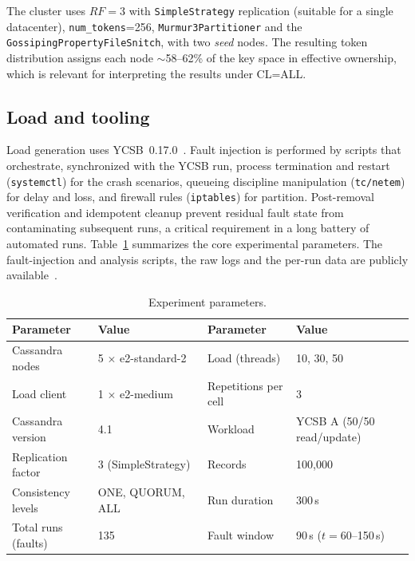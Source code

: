 \documentclass[runningheads]{llncs}
\begin{document}
The cluster uses $RF=3$ with \texttt{SimpleStrategy} replication (suitable for a
single datacenter), \texttt{num\_tokens}=256, \texttt{Murmur3\-Partitioner} and
the \texttt{Gossiping\-Property\-File\-Snitch}, with two \emph{seed} nodes. The
resulting
token distribution assigns each node $\sim$58--62\% of the key space in effective
ownership, which is relevant for interpreting the results under CL=ALL.

\subsection{Load and tooling}

Load generation uses YCSB~0.17.0~\cite{ycsb}. Fault injection is performed by
scripts that orchestrate, synchronized with the YCSB run, process termination and
restart (\texttt{systemctl}) for the crash scenarios, queueing discipline
manipulation (\texttt{tc/netem}) for delay and loss, and firewall rules
(\texttt{iptables}) for partition. Post-removal verification and idempotent
cleanup prevent residual fault state from contaminating subsequent runs, a
critical requirement in a long battery of automated runs. Table~\ref{tab:params}
summarizes the core experimental parameters. The fault-injection and analysis
scripts, the raw logs and the per-run data are publicly available~\cite{artifact}.

\begin{table}[t]
\centering
\scriptsize
\renewcommand{\arraystretch}{1.15}
\setlength{\tabcolsep}{3.5pt}
\caption{Experiment parameters.}
\label{tab:params}
\begin{tabular}{llll}
\toprule
\textbf{Parameter} & \textbf{Value} & \textbf{Parameter} & \textbf{Value} \\
\midrule
\rowcolor{gray!12}
Cassandra nodes & 5 $\times$ e2-standard-2 & Load (threads) & 10, 30, 50 \\
Load client & 1 $\times$ e2-medium & Repetitions per cell & 3 \\
\rowcolor{gray!12}
Cassandra version & 4.1 & Workload & YCSB A (50/50 read/update) \\
Replication factor & 3 (SimpleStrategy) & Records & 100,000 \\
\rowcolor{gray!12}
Consistency levels & ONE, QUORUM, ALL & Run duration & 300\,s \\
Total runs (faults) & 135 & Fault window & 90\,s ($t=60$--150\,s) \\
\bottomrule
\end{tabular}
\end{table}
\end{document}
